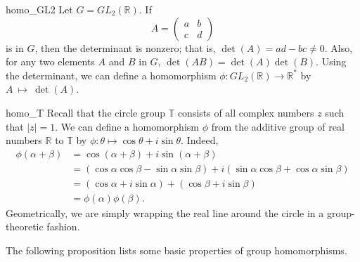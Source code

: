  
\begin{example}{homo_GL2}
Let $G = GL_2( {\mathbb R })$. If
\[
A=
\begin{pmatrix}
a & b \\
c & d
\end{pmatrix}
\]
is in $G$, then the determinant is  nonzero; that is, $\det(A) = ad -bc
\neq 0$.  Also, for any two elements $A$ and $B$ in $G$, $\det(AB) =
\det(A) \det(B)$. Using the determinant, we can define a homomorphism
$\phi : GL_2( {\mathbb R }) \rightarrow {\mathbb R}^\ast$ by
$A~\mapsto~\det(A)$.  
\mbox{\vspace{1in}}
\end{example}
 
 
\begin{example}{homo_T}
Recall that the circle group ${ \mathbb T}$ consists of all complex
numbers $z$ such that $|z|=1$. We can define a homomorphism $\phi$
from the additive group of real numbers ${\mathbb R}$ to ${\mathbb T}$ by
$\phi : \theta \mapsto \cos \theta + i \sin \theta$. Indeed, 
\begin{align*}
\phi( \alpha + \beta )
& =
\cos( \alpha + \beta ) + i \sin( \alpha + \beta ) \\
& =
(\cos \alpha \cos \beta - \sin \alpha \sin \beta)  + i( \sin \alpha 
\cos \beta + \cos \alpha \sin \beta ) \\
& =
(\cos \alpha + i \sin \alpha ) + (\cos \beta + i \sin \beta
) \\
& = \phi( \alpha ) \phi( \beta ).
\end{align*}
Geometrically, we are simply wrapping the real line around the circle 
in a group-theoretic fashion. 
\end{example}

 
The following proposition lists some basic properties of group
homomorphisms.
 
